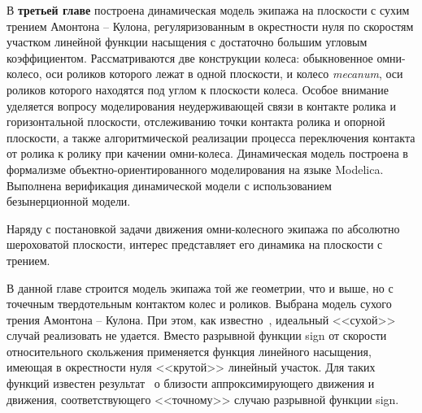 
В \textbf{третьей главе} построена динамическая модель экипажа на плоскости с сухим трением Амонтона -- Кулона, регуляризованным в окрестности нуля по скоростям участком линейной функции насыщения с достаточно большим угловым коэффициентом. Рассматриваются две конструкции колеса: обыкновенное омни-колесо, оси роликов которого лежат в одной плоскости, и колесо \textit{mecanum}, оси роликов которого находятся под углом к плоскости колеса. Особое внимание уделяется вопросу моделирования неудерживающей связи в контакте ролика и горизонтальной плоскости, отслеживанию точки контакта ролика и опорной плоскости, а также алгоритмической реализации процесса переключения контакта от ролика к ролику при качении омни-колеса. Динамическая модель построена в формализме объектно-ориентированного моделирования на языке Modelica. Выполнена верификация динамической модели с использованием безынерционной модели.

%
Наряду с постановкой задачи движения омни-колесного экипажа по абсолютно шероховатой плоскости, интерес представляет его динамика на плоскости с трением.

В данной главе строится модель экипажа той же геометрии, что и выше,
но с точечным твердотельным контактом колес и роликов.
Выбрана модель сухого трения Амонтона -- Кулона. При этом, как известно~\cite{Novozhilov1991}, 
идеальный <<сухой>> случай реализовать не удается. Вместо разрывной функции 
sign от скорости относительного скольжения применяется функция линейного насыщения,
имеющая в окрестности нуля <<крутой>> линейный участок. Для таких функций известен 
результат~\cite{Novozhilov1991} о близости аппроксимирующего движения и движения, 
соответствующего <<точному>> случаю разрывной функции sign. 


